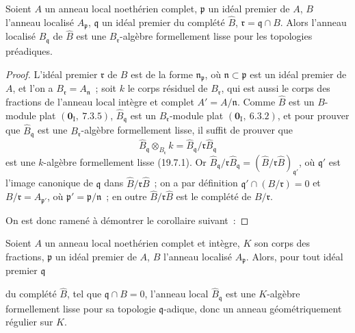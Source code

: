 \begin{theorem}[22.3.3]
\label{0.22.3.3-fr}
Soient $A$ un anneau local noethérien complet, $\mathfrak p$ un idéal
premier de $A$, $B$ l'anneau localisé $A_\mathfrak p$, $\mathfrak q$ un
idéal premier du complété $\widehat B$, $\mathfrak r=\mathfrak q\cap B$.
Alors l'anneau localisé $\widehat B_\mathfrak q$ de $\widehat B$ est une
$B_\mathfrak r$-algèbre formellement lisse pour les topologies préadiques.
\end{theorem}

\begin{proof}
L'idéal premier $\mathfrak r$ de $B$ est de la forme
$\mathfrak n_\mathfrak p$, où $\mathfrak n\subset\mathfrak p$ est un idéal
premier de $A$, et l'on a $B_\mathfrak r=A_\mathfrak n$~; soit $k$ le corps
résiduel de $B_\mathfrak r$, qui est aussi le corps des fractions de l'anneau
local intègre et complet $A'=A/\mathfrak n$. Comme $\widehat B$ est un
$B$-module plat $(\mathbf 0_\mathrm I,~7.3.5)$,
$\widehat B_\mathfrak q$ est un $B_\mathfrak r$-module plat
$(\mathbf 0_\mathrm I,~6.3.2)$, et pour prouver que
$\widehat B_\mathfrak q$ est une $B_\mathfrak r$-algèbre formellement
lisse, il suffit de prouver que
\[
  \widehat B_\mathfrak q\otimes_{B_\mathfrak r}k
  =\widehat B_\mathfrak q/\mathfrak r\widehat B_\mathfrak q
\]
est une $k$-algèbre formellement lisse (19.7.1). Or
$\widehat B_\mathfrak q/\mathfrak r\widehat B_\mathfrak q
=(\widehat B/\mathfrak r\widehat B)_{\mathfrak q'}$, où $\mathfrak q'$ est
l'image canonique de $\mathfrak q$ dans
$\widehat B/\mathfrak r\widehat B$~; on a par définition
$\mathfrak q'\cap(B/\mathfrak r)=0$ et
$B/\mathfrak r=A_{\mathfrak p'}$, où
$\mathfrak p'=\mathfrak p/\mathfrak n$~; en outre
$\widehat B/\mathfrak r\widehat B$ est le complété de $B/\mathfrak r$.

On est donc ramené à démontrer le corollaire suivant~:
\end{proof}

\begin{corollary}[22.3.4]
\label{0.22.3.4-fr}
Soient $A$ un anneau local noethérien complet et intègre, $K$ son corps des
fractions, $\mathfrak p$ un idéal premier de $A$, $B$ l'anneau localisé
$A_\mathfrak p$. Alors, pour tout idéal premier $\mathfrak q$


du complété $\widehat B$, tel que $\mathfrak q\cap B=0$, l'anneau local
$\widehat B_\mathfrak q$ est une $K$-algèbre formellement lisse pour sa
topologie $\mathfrak q$-adique, donc un anneau géométriquement régulier sur
$K$.
\end{corollary}

